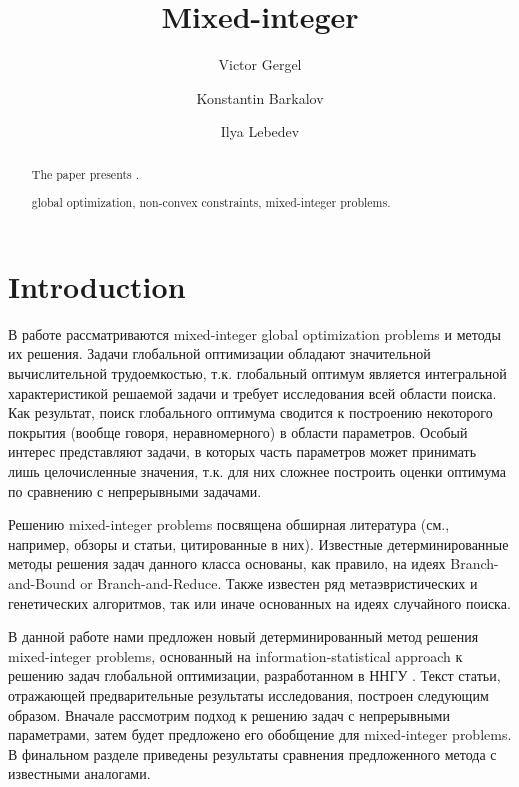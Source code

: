 \documentclass{llncs}
\begin{document}
\mainmatter 

\title{Mixed-integer}
\author{Victor Gergel \and Konstantin Barkalov \and Ilya Lebedev %
\\
}


\maketitle

\begin{abstract}
The paper presents .

\keywords global optimization, non-convex constraints, mixed-integer problems.

\end{abstract}

\section{Introduction}\label{sec:intro}
\Russian
В работе рассматриваются mixed-integer global optimization problems и методы их решения. Задачи глобальной оптимизации обладают значительной вычислительной трудоемкостью, т.к. глобальный оптимум является интегральной характеристикой решаемой задачи и требует исследования всей области поиска. Как результат, поиск глобального оптимума сводится к построению некоторого покрытия (вообще говоря, неравномерного) в области параметров. Особый интерес представляют задачи, в которых часть параметров может принимать лишь целочисленные значения, т.к. для них сложнее построить оценки оптимума по сравнению с непрерывными задачами.

Решению mixed-integer problems посвящена обширная литература (см., например, обзоры \cite{Burer,Boukouvala} и статьи, цитированные в них). Известные детерминированные методы решения задач данного класса основаны, как правило, на идеях Branch-and-Bound or Branch-and-Reduce. Также известен ряд метаэвристических и генетических алгоритмов, так или иначе основанных на идеях случайного поиска.

В данной работе нами предложен новый детерминированный метод решения mixed-integer problems, основанный на information-statistical approach к решению задач глобальной оптимизации, разработанном в ННГУ \cite{Strongin2000,Strongin2013}. Текст статьи, отражающей предварительные результаты исследования, построен следующим образом. Вначале рассмотрим подход к решению задач с непрерывными параметрами, затем будет предложено его обобщение для mixed-integer problems. В финальном разделе приведены результаты сравнения предложенного метода с известными аналогами.
\end{document}
